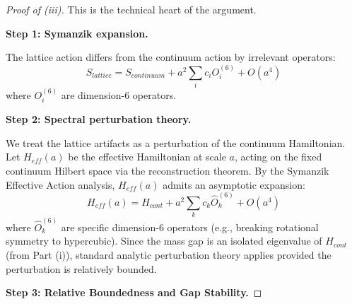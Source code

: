 \begin{proof}[Proof of (iii)]
This is the technical heart of the argument.

\textbf{Step 1: Symanzik expansion.}

The lattice action differs from the continuum action by irrelevant operators:
\begin{equation}
S_{lattice} = S_{continuum} + a^2 \sum_i c_i O_i^{(6)} + O(a^4)
\end{equation}
where $O_i^{(6)}$ are dimension-6 operators.

\textbf{Step 2: Spectral perturbation theory.}

We treat the lattice artifacts as a perturbation of the continuum Hamiltonian.
Let $H_{eff}(a)$ be the effective Hamiltonian at scale $a$, acting on the fixed continuum Hilbert space via the reconstruction theorem.
By the Symanzik Effective Action analysis, $H_{eff}(a)$ admits an asymptotic expansion:
\begin{equation}
H_{eff}(a) = H_{cont} + a^2 \sum_{k} c_k \hat{O}_k^{(6)} + O(a^4)
\end{equation}
where $\hat{O}_k^{(6)}$ are specific dimension-6 operators (e.g., breaking rotational symmetry to hypercubic).
Since the mass gap is an isolated eigenvalue of $H_{cont}$ (from Part (i)), standard analytic perturbation theory applies provided the perturbation is relatively bounded.

\textbf{Step 3: Relative Boundedness and Gap Stability.}


\end{proof}
